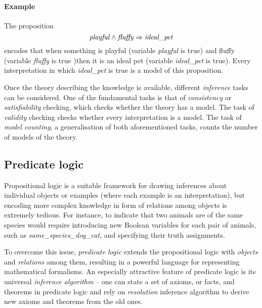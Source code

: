 \paragraph{Example} The proposition
$$\text{\textit{playful}} \wedge \text{\textit{fluffy}} \Rightarrow \text{\textit{ideal\_pet}} $$
encodes that when something is playful (variable \textit{playful} is true) and fluffy (variable \textit{fluffy} is true )then it is an ideal pet (variable \textit{ideal\_pet} is true).
Every interpretation in which \textit{ideal\_pet} is true is a model of this proposition.




Once the theory describing the knowledge is available, different \textit{inference} tasks can be considered.
One of the fundamental tasks is that of \textit{consistency} or \textit{satisfiability} checking, which checks whether the theory has a model.
The task of \textit{validity} checking checks whether every interpretation is a model.
The task of \textit{model counting}, a generalisation of both aforementioned tasks, counts the number of models of the theory.









\subsection{Predicate logic}


Propositional logic is a suitable framework for drawing inferences about individual objects or examples (where each example is an interpretation), but encoding more complex knowledge in form of relations among objects is extremely tedious.
For instance, to indicate that two animals are of the same species would require introducing new Boolean variables for each pair of animals, such as \textit{same\_species\_dog\_cat}, and specifying their truth assignments.



To overcome this issue, \textit{predicate logic} extends the propositional logic with \textit{objects} and \textit{relations} among them, resulting in a powerful language for representing mathematical formalisms.
An especially attractive feature of predicate logic is its universal \textit{inference algorithm} -- one can state a set of axioms, or facts, and theorems in predicate logic and rely on \textit{resolution} \cite{Robinson:1965:Resolution} inference algorithm to derive new axioms and theorems from the old ones.



